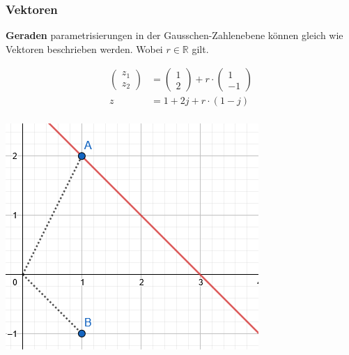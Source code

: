 \subsubsection{Vektoren}
\begin{minipage}{\columnwidth}	
	\noindent\textbf{Geraden} parametrisierungen in der Gausschen-Zahlenebene können gleich wie Vektoren beschrieben werden. Wobei $r \in \mathbb{R}$ gilt.
		
	\begin{minipage}{0.6\textwidth}
		\begin{align*}
			\begin{pmatrix}z_1 \\ z_2\end{pmatrix} &= \begin{pmatrix}1 \\ 2\end{pmatrix} +  r \cdot \begin{pmatrix}1 \\ -1\end{pmatrix} \\
			z &= 1 + 2j + r \cdot (1-j) \\
		\end{align*}
	\end{minipage}%
	\begin{minipage}{0.4\textwidth}
		\includegraphics[width=\columnwidth]{Images/parameter_gerade}
	\end{minipage}
\end{minipage}
